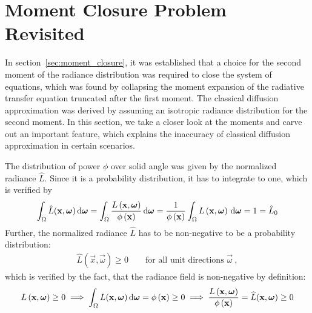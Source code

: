 \section{Moment Closure Problem Revisited}
\label{sec:moment_problem_revisited}

In section~\ref{sec:moment_closure}, it was established that a choice for the second moment of the radiance distribution was required to close the system of equations, which was found by collapsing the moment expansion of the radiative transfer equation truncated after the first moment. The classical diffusion approximation was derived by assuming an isotropic radiance distribution for the second moment. In this section, we take a closer look at the moments and carve out an important feature, which explains the inaccuracy of classical diffusion approximation in certain scenarios.

The distribution of power $\phi$ over solid angle was given by the normalized radiance $\widehat{L}$. Since it is a probability distribution, it has to integrate to one, which is verified by
\begin{align*}
\int_{\Omega}{\hat{L}(\boldsymbol{\mathbf{x}}, \boldsymbol{\mathbf{\omega}})\,\mathrm{d}\boldsymbol{\mathbf{\omega}}}=
\int_{\Omega}{\frac{L\left(\boldsymbol{\mathbf{x}}, \boldsymbol{\mathbf{\omega}}\right)}{\phi\left(\boldsymbol{\mathbf{x}}\right)}\,\mathrm{d}\boldsymbol{\mathbf{\omega}}}=
\frac{1}{\phi\left(\boldsymbol{\mathbf{x}}\right)}
\int_{\Omega}{L\left(\boldsymbol{\mathbf{x}}, \boldsymbol{\mathbf{\omega}}\right)\,\mathrm{d}\boldsymbol{\mathbf{\omega}}}
=1
=\hat{L}_0
\end{align*}
Further, the normalized radiance $\widehat{L}$ has to be non-negative to be a probability distribution:
\begin{align*}
\hat{L}(\vec{x}, \vec{\omega})\ge 0 \qquad \text{for all unit directions } \vec{\omega}
\ ,
\end{align*}
which is verified by the fact, that the radiance field is non-negative by definition:
\begin{align*}
L\left(\boldsymbol{\mathbf{x}}, \boldsymbol{\mathbf{\omega}}\right) \ge 0
\implies
\int_{\Omega}{L(\boldsymbol{\mathbf{x}}, \boldsymbol{\mathbf{\omega}})\,\mathrm{d}\boldsymbol{\mathbf{\omega}}}=\phi\left(\boldsymbol{\mathbf{x}}\right)\ge 0
\implies
\frac{L\left(\boldsymbol{\mathbf{x}}, \boldsymbol{\mathbf{\omega}}\right)}{\phi\left(\boldsymbol{\mathbf{x}}\right)}=\widehat{L}(\boldsymbol{\mathbf{x}}, \boldsymbol{\mathbf{\omega}}) \ge 0
\end{align*}

